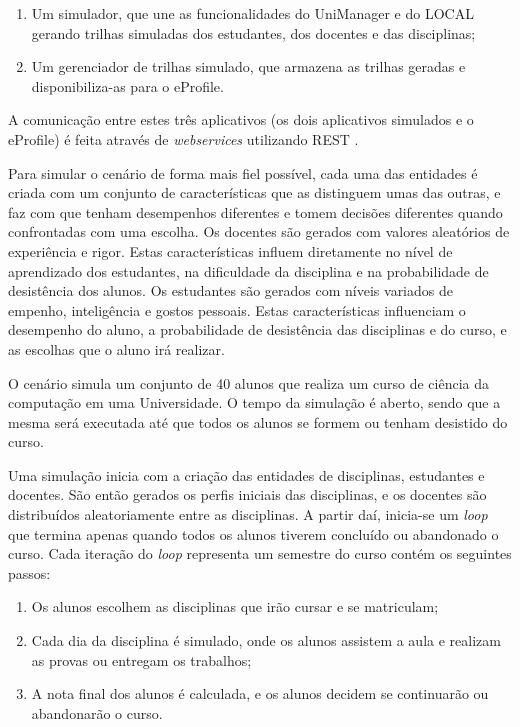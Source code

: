\begin{enumerate}
  \item Um simulador, que une as funcionalidades do UniManager e do LOCAL gerando trilhas simuladas dos estudantes, dos docentes e das disciplinas;
  \item Um gerenciador de trilhas simulado, que armazena as trilhas geradas e disponibiliza-as para o eProfile.
\end{enumerate}

A comunicação entre estes três aplicativos (os dois aplicativos simulados e o eProfile) é feita através de {\em webservices} utilizando REST \cite{fieldings00}.

Para simular o cenário de forma mais fiel possível, cada uma das entidades é criada com um conjunto de características que as distinguem umas das outras, e faz com que tenham desempenhos diferentes e tomem decisões diferentes quando confrontadas com uma escolha. Os docentes são gerados com valores aleatórios de experiência e rigor. Estas características influem diretamente no nível de aprendizado dos estudantes, na dificuldade da disciplina e na probabilidade de desistência dos alunos. Os estudantes são gerados com níveis variados de empenho, inteligência e gostos pessoais. Estas características influenciam o desempenho do aluno, a probabilidade de desistência das disciplinas e do curso, e as escolhas que o aluno irá realizar.

O cenário simula um conjunto de 40 alunos que realiza um curso de ciência da computação em uma Universidade. O tempo da simulação é aberto, sendo que a mesma será executada até que todos os alunos se formem ou tenham desistido do curso.

Uma simulação inicia com a criação das entidades de disciplinas, estudantes e docentes. São então gerados os perfis iniciais das disciplinas, e os docentes são distribuídos aleatoriamente entre as disciplinas. A partir daí, inicia-se um {\em loop} que termina apenas quando todos os alunos tiverem concluído ou abandonado o curso. Cada iteração do {\em loop} representa um semestre do curso contém os seguintes passos:

\begin{enumerate}
  \item Os alunos escolhem as disciplinas que irão cursar e se matriculam;
  \item Cada dia da disciplina é simulado, onde os alunos assistem a aula e realizam as provas ou entregam os trabalhos;
  \item A nota final dos alunos é calculada, e os alunos decidem se continuarão ou abandonarão o curso.
\end{enumerate}

